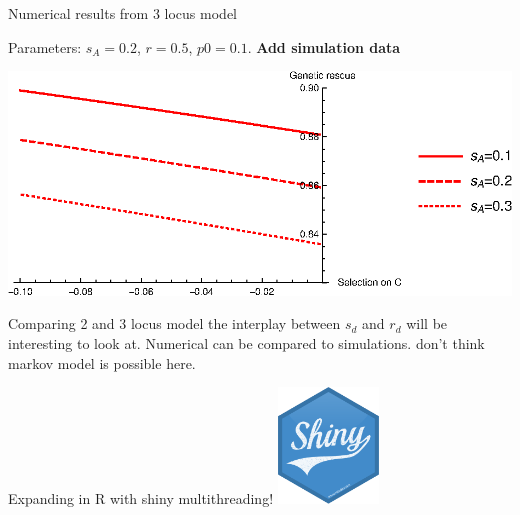 \documentclass{beamer}
\begin{document}
\begin{frame}{Numerical results from 3 locus model}
 
 Parameters: $s_A = 0.2$, $r=0.5$, $p0 = 0.1$.
 \textbf{Add simulation data}
 
 \vfill
 
 \includegraphics[width = 1.0\textwidth]{Matlab/Figures/3locuseffect.eps}
     
\end{frame}

\begin{frame}{Comparing 2 and 3 locus model}
    the interplay between $s_d$ and $r_d$ will be interesting to look at. Numerical can be compared to simulations. don't think markov model is possible here.
\end{frame}

\begin{frame}{Expanding in R with shiny}
    multithreading! 
    \includegraphics[width=0.2\textwidth]{Figures/shiny-hex.png}
\end{frame}
\end{document}
